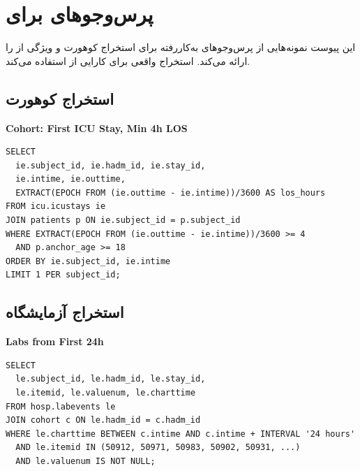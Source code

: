 \chapter{پرس‌وجوهای  برای }
\label{app:sql}

این پیوست نمونه‌هایی از پرس‌وجوهای  به‌کاررفته برای استخراج کوهورت و ویژگی از  را ارائه می‌کند. استخراج واقعی برای کارایی از  استفاده می‌کند.


\section{استخراج کوهورت}

\begin{latin}\smallskip\noindent\textbf{Cohort: First ICU Stay, Min 4h LOS}\par\smallskip
\begin{Verbatim}[fontsize=\footnotesize,frame=single]
SELECT 
  ie.subject_id, ie.hadm_id, ie.stay_id,
  ie.intime, ie.outtime,
  EXTRACT(EPOCH FROM (ie.outtime - ie.intime))/3600 AS los_hours
FROM icu.icustays ie
JOIN patients p ON ie.subject_id = p.subject_id
WHERE EXTRACT(EPOCH FROM (ie.outtime - ie.intime))/3600 >= 4
  AND p.anchor_age >= 18
ORDER BY ie.subject_id, ie.intime
LIMIT 1 PER subject_id;
\end{Verbatim}
\end{latin}

\section{استخراج آزمایشگاه}

\begin{latin}\smallskip\noindent\textbf{Labs from First 24h}\par\smallskip
\begin{Verbatim}[fontsize=\footnotesize,frame=single]
SELECT 
  le.subject_id, le.hadm_id, le.stay_id,
  le.itemid, le.valuenum, le.charttime
FROM hosp.labevents le
JOIN cohort c ON le.hadm_id = c.hadm_id
WHERE le.charttime BETWEEN c.intime AND c.intime + INTERVAL '24 hours'
  AND le.itemid IN (50912, 50971, 50983, 50902, 50931, ...)
  AND le.valuenum IS NOT NULL;
\end{Verbatim}
\end{latin}

